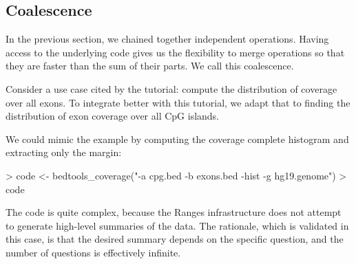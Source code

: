 \documentclass[10pt]{article}
\begin{document}
\subsection{Coalescence}

In the previous section, we chained together independent
operations. Having access to the underlying code gives us the
flexibility to merge operations so that they are faster than the sum
of their parts. We call this coalescence.

Consider a use case cited by the  tutorial: compute
the distribution of coverage over all exons. To integrate better with
this tutorial, we adapt that to finding the distribution of exon
coverage over all CpG islands. 

We could mimic the example by computing the coverage complete
histogram and extracting only the margin:
\begin{Schunk}
\begin{Sinput}
> code <- bedtools_coverage("-a cpg.bed -b exons.bed -hist -g hg19.genome")
> code
\end{Sinput}
\end{Schunk}
The code is quite complex, because the Ranges infrastructure does
not attempt to generate high-level summaries of the data. The
rationale, which is validated in this case, is that the desired
summary depends on the specific question, and the number of questions
is effectively infinite.
\end{document}
